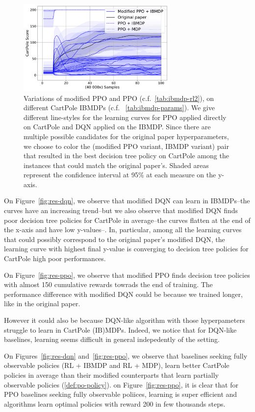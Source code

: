 \begin{figure}
    \centering
    \includegraphics[width=0.7\textwidth]{images/images_part1/ppo.pdf}
    \caption{Variations of modified PPO and PPO (c.f.~\ref{tab:ibmdp-rl2}), on different CartPole IBMDPs (c.f. ~\ref{tab:ibmdp-params}). We give different line-styles for the learning curves for PPO applied directly on CartPole and DQN applied on the IBMDP.
    Since there are multiple possible candidates for the original paper hyperparameters, we choose to color the (modified PPO variant, IBMDP variant) pair that resulted in the best decision tree policy on CartPole among the instances that could match the original paper's.
    Shaded areas represent the confidence interval at 95\% at each measure on the y-axis.}
\end{figure}\label{fig:res-ppo}

On Figure~\ref{fig:res-dqn}, we observe that modified DQN can learn in IBMDPs--the curves have an increasing trend--but we also observe that modified DQN finds poor decision tree policies for CartPole in average--the curves flatten at the end of the x-axis and have low y-values--.
In, particular, among all the learning curves that could possibly correspond to the original paper's modified DQN, the learning curve with highest final y-value is converging to decision tree policies for CartPole high poor performances.

On Figure~\ref{fig:res-ppo}, we observe that modified PPO finds decision tree policies with almost 150 cumulative rewards towrads the end of training. The performance difference with modified DQN could be because we trained longer, like in the original paper.

However it could also be because DQN-like algorithm with those hyperpameters struggle to learn in CartPole (IB)MDPs.
Indeed, we notice that for DQN-like baselines, learning seems difficult in general indepedently of the setting.

On Figures~\ref{fig:res-dqn} and~\ref{fig:res-ppo}, we observe that baselines seeking fully observable policies (RL + IBMDP and RL + MDP), learn better CartPole policies in average than their modified counterparts that learn partially observable policies (\ref{def:po-policy}). 
on Figure~\ref{fig:res-ppo}, it is clear that for PPO baselines seeking fully observable poliices, learning is super efficient and algorithms learn optimal policies with reward 200 in few thousands steps.

